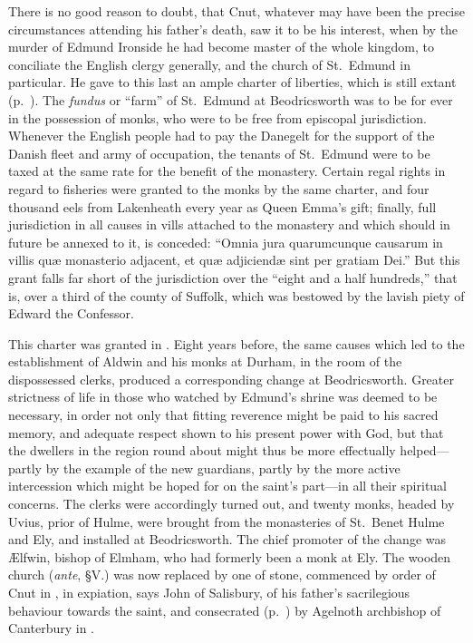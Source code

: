 \documentclass[10pt]{book}
\begin{document}
{There is no good reason to doubt, that Cnut, whatever may have been the precise circumstances attending his father's death, saw it to be his interest, when by the murder of Edmund Ironside he had become master of the whole kingdom, to conciliate the English clergy generally, and the church of St.\ Edmund in particular. He gave to this last an ample charter of liberties, which is still extant (p.\ ). The \emph{fundus} or ``farm'' of St.\ Edmund at Beodricsworth was to be for ever in the possession of monks, who were to be free from episcopal jurisdiction. Whenever the English people had to pay the Danegelt for the support of the Danish fleet and army of occupation, the tenants of St.\ Edmund were to be taxed at the same rate for the benefit of the monastery. Certain regal rights in regard to fisheries were granted to the monks by the same charter, and four thousand eels from Lakenheath every year as Queen Emma's gift; finally, full jurisdiction in all causes in vills attached to the monastery and which should in future be annexed to it, is conceded: ``Omnia jura quarumcunque causarum in villis qu\ae{} monasterio adjacent, et qu\ae{} adjiciend\ae{} sint per gratiam Dei.'' But this grant falls far short of the jurisdiction over the ``eight and a half hundreds,'' that is, over a third of the county of Suffolk, which was bestowed by the lavish piety of Edward the Confessor.

This charter was granted in . Eight years before, the same causes which led to the establishment of Aldwin and his monks at Durham,  in the room of the dispossessed clerks, produced a corresponding change at Beodricsworth. Greater strictness of life in those who watched by Edmund's shrine was deemed to be necessary, in order not only that fitting reverence might be paid to his sacred memory, and adequate respect shown to his present power with God, but that the dwellers in the region round about might thus be more effectually helped---partly by the example of the new guardians, partly by the more active intercession which might be hoped for on the saint's part---in all their spiritual concerns. The clerks were accordingly turned out, and twenty monks, headed by Uvius, prior of Hulme, were brought from the monasteries of St.\ Benet Hulme and Ely, and installed at Beodricsworth. The chief promoter of the change was \AE{}lfwin, bishop of Elmham, who had formerly been a monk at Ely. The wooden church (\emph{ante}, \S{}V.) was now replaced by one of stone, commenced by order of Cnut in , in expiation, says John of Salisbury, of his father's sacrilegious behaviour towards the saint, and consecrated (p.\ ) by Agelnoth archbishop of Canterbury in .

}
\end{document}
